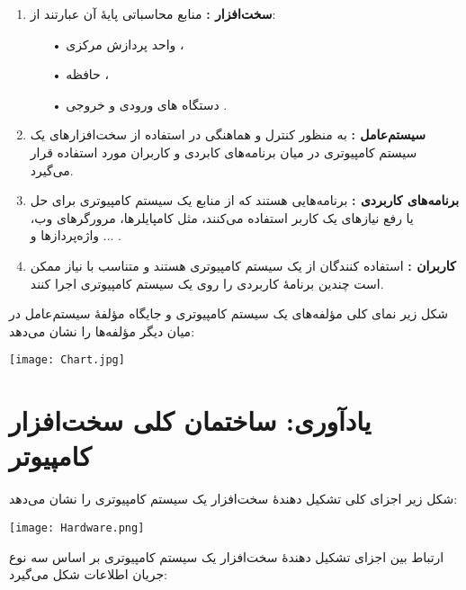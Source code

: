 \documentclass{article}
\begin{document}
\begin{enumerate}

	\item \textbf{سخت‌افزار :}  منابع محاسباتی پایۀ آن عبارتند از:
	\begin{enumerate}
	    \item[•]واحد پردازش مرکزی ،
	    \item[•]حافظه ،
	    \item[•]دستگاه های ورودی و خروجی .
	\end{enumerate}



	\item \textbf { سیستم‌عامل :} به منظور کنترل و هماهنگی در استفاده از سخت‌افزار‌های یک سیستم کامپیوتری در میان برنامه‌های کابردی و کاربران مورد استفاده قرار می‌گیرد.
    
    \item \textbf{برنامه‌های کاربردی :} برنامه‌هایی هستند که از منابع یک سیستم کامپیوتری برای حل یا رفع نیاز‌های یک کاربر استفاده می‌کنند، مثل کامپایلر‌ها، مرورگر‌های وب، واژه‌پرداز‌ها و ... .



	\item \textbf{کاربران :}
	استفاده کنندگان از یک سیستم کامپیوتری هستند و متناسب با نیاز ممکن است چندین برنامۀ کاربردی را روی یک سیستم کامپیوتری اجرا کنند.
	
\end{enumerate}


شکل زیر نمای کلی مؤلفه‌های یک سیستم کامپیوتری و جایگاه مؤلفۀ سیستم‌عامل در میان دیگر مؤلفه‌ها را نشان می‌دهد:


\begin{center}
\texttt{[image: Chart.jpg]}   
\end{center}


\section{یادآوری: ساختمان کلی سخت‌افزار کامپیوتر}

شکل زیر اجزای کلی تشکیل دهندۀ سخت‌افزار یک سیستم کامپیوتری را نشان می‌دهد:
\begin{center}


\texttt{[image: Hardware.png]}   

\end{center}
ارتباط بین اجزای تشکیل دهندۀ سخت‌افزار یک سیستم کامپیوتری بر اساس سه نوع جریان اطلاعات شکل می‌گیرد:
\end{document}
